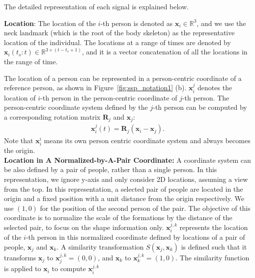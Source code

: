 The detailed representation of each signal is explained below. 

\noindent \textbf{Location}:	
The location of the $i$-th person is denoted as $\mathbf{x}_i  \in \mathbb{R}^3$, and we use the neck landmark (which is the root of the body skeleton) as the representative location of the individual. The locations at a range of times are denoted by $\mathbf{x}_i(t_s:t) \in \mathbb{R}^{3 \times (t-t_s+1)}$, and it is a vector concatenation of all the locations in the range of time. 

The location of a person can be represented in a person-centric coordinate of a reference person, as shown in Figure~\ref{fig:ssp_notation1} (b). $\mathbf{x}_i^j$ denotes the location of $i$-th person in the person-centric coordinate of $j$-th person. The person-centric coordinate system defined by the $j$-th person can be computed by a corresponding rotation matrix $\mathbf{R}_j$ and $\mathbf{x}_j$:
\begin{align}
	\mathbf{x}_i^j(t)  = \mathbf{R}_j ( \mathbf{x}_i - \mathbf{x}_j).
\end{align}
Note that $\mathbf{x}_i^i$ means its own person centric coordinate system and always becomes the origin. \\

\noindent \textbf{Location in A Normalized-by-A-Pair Coordinate: } 
A coordinate system can be also defined by a pair of people, rather than a single person. In this representation, we ignore y-axis and only consider 2D locations, assuming a view from the top. In this representation, a selected pair of people are located in the origin and a fixed position with a unit distance from the origin respectively. We use $(1,0)$ for the position of the second person of the pair. The objective of this coordinate is to normalize the scale of the formations by the distance of the selected pair, to focus on the shape information only. $\mathbf{x}_i^{j,k}$ represents the location of the $i$-th person in this normalized coordinate defined by locations of a pair of people, $\mathbf{x}_j$ and $\mathbf{x}_k$. A similarity transformation $S(\mathbf{x}_j, \mathbf{x}_k)$ is defined such that it transforms $\mathbf{x}_j$ to $\mathbf{x}_j^{j,k}=(0,0)$, and $\mathbf{x}_k$ to $\mathbf{x}_k^{j,k} = (1,0)$. The similarity function is applied to $\mathbf{x}_i$ to compute $\mathbf{x}_i^{j,k}$ \\

